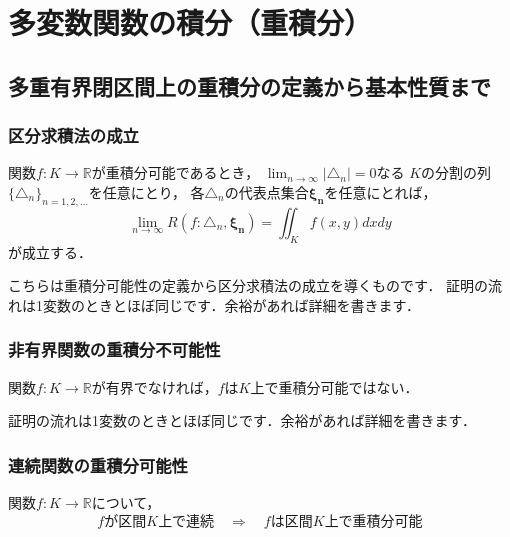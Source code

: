 \documentclass[./index]{subfiles}
\begin{document}
\section{多変数関数の積分（重積分）}
\subsection{多重有界閉区間上の重積分の定義から基本性質まで}
\subsubsection{区分求積法の成立}
\begin{screen}
    \begin{proposition}
        関数$f:K \rightarrow \mathbb{R}$が重積分可能であるとき，
        $\lim_{n\rightarrow\infty} |\triangle_n| = 0$なる
        $K$の分割の列$\{\triangle_n\}_{n=1,2,\dots}$を任意にとり，
        各$\triangle_n$の代表点集合$\mathbf{\xi_n}$を任意にとれば，
        \begin{equation}
            \lim_{n\rightarrow\infty} R(f: \triangle_n, \mathbf{\xi_n})
            =
            \iint_K f(x, y) dx dy
        \end{equation}
        が成立する．
    \end{proposition}
\end{screen}

こちらは重積分可能性の定義から区分求積法の成立を導くものです．
証明の流れは1変数のときとほぼ同じです．余裕があれば詳細を書きます．

\subsubsection{非有界関数の重積分不可能性}
\begin{screen}
    \begin{proposition}
        関数$f: K \rightarrow \mathbb{R}$が有界でなければ，$f$は$K$上で重積分可能ではない．
    \end{proposition}
\end{screen}

証明の流れは1変数のときとほぼ同じです．余裕があれば詳細を書きます．

\subsubsection{連続関数の重積分可能性}
\begin{screen}
    \begin{proposition}
        関数$f: K \rightarrow \mathbb{R}$について，
        \begin{equation}
            \mbox{$f$が区間$K$上で連続} \quad \Longrightarrow \quad \mbox{$f$は区間$K$上で重積分可能}
        \end{equation}
    \end{proposition}
\end{screen}
\end{document}
